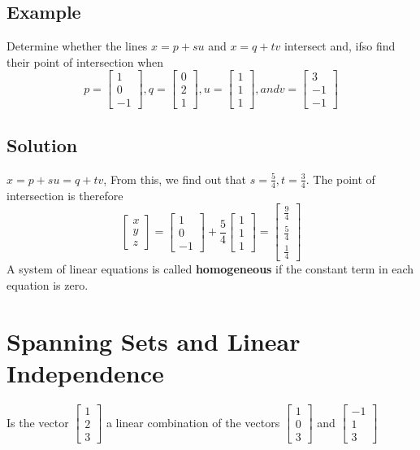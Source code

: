 \subsection*{Example}
Determine whether the lines $x = p + su$ and $x = q+tv$ intersect and, ifso find their point of intersection when
$$p = \begin{bmatrix}
    1\\0\\-1
\end{bmatrix}, q = \begin{bmatrix}
    0\\2\\1
\end{bmatrix}, u = \begin{bmatrix}
    1\\1\\1
\end{bmatrix}, and v = \begin{bmatrix}
    3\\-1\\-1
\end{bmatrix}$$
\subsection*{Solution}
$x = p+su = q+tv$, From this, we find out that $s = \frac{5}{4}, t = \frac{3}{4}$. The point of intersection is therefore
$$\begin{bmatrix}
    x\\y\\z
\end{bmatrix} = \begin{bmatrix}
    1\\0\\-1
\end{bmatrix}+\frac{5}{4}\begin{bmatrix}
    1\\1\\1
\end{bmatrix} = \begin{bmatrix}
    \frac{9}{4}\\\frac{5}{4}\\\frac{1}{4}
\end{bmatrix}$$
A system of linear equations is called \textbf{homogeneous} if the constant term in each equation is zero.

\section{Spanning Sets and Linear Independence}
Is the vector $\begin{bmatrix}
    1\\2\\3
\end{bmatrix}$ a linear combination of the vectors $\begin{bmatrix}
    1\\0\\3
\end{bmatrix}$ and $\begin{bmatrix}
    -1\\1\\3
\end{bmatrix}$
